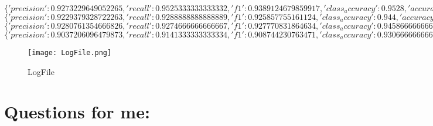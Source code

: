 \documentclass{article}
\begin{document}
$\{'precision': 0.9273229649052265, 'recall': 0.9525333333333332, 'f1': 0.9389124679859917, 'class_accuracy': 0.9528, 'accuracy': 0.9527999758720398\}$\\

$\{'precision': 0.9229379328722263, 'recall': 0.9288888888888889, 'f1': 0.925857755161124, 'class_accuracy': 0.944, 'accuracy': 0.9440000057220459\}$\\

$\{'precision': 0.9280761354666826, 'recall': 0.9274666666666667, 'f1': 0.927770831864634, 'class_accuracy': 0.9458666666666666, 'accuracy': 0.9458666443824768\}$\\

$\{'precision': 0.9037206096479873, 'recall': 0.9141333333333334, 'f1': 0.908744230763471, 'class_accuracy': 0.9306666666666666, 'accuracy': 0.9306666851043701\}$

\begin{figure}[h!]
    \centering
    \texttt{[image: LogFile.png]}
    \caption{LogFile}
    \label{fig:enter-label}
\end{figure}


\section{Questions for me:}
\end{document}

